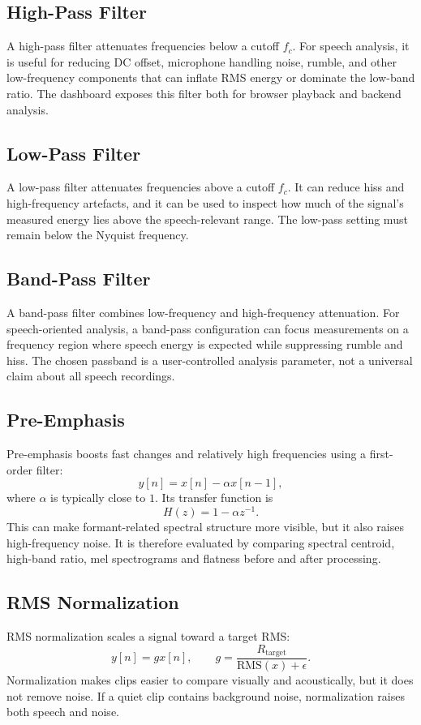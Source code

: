 ﻿\documentclass[11pt,a4paper]{article}
\begin{document}
\subsection{High-Pass Filter}
A high-pass filter attenuates frequencies below a cutoff $f_c$. For speech analysis, it is useful for reducing DC offset, microphone handling noise, rumble, and other low-frequency components that can inflate RMS energy or dominate the low-band ratio. The dashboard exposes this filter both for browser playback and backend analysis.

\subsection{Low-Pass Filter}
A low-pass filter attenuates frequencies above a cutoff $f_c$. It can reduce hiss and high-frequency artefacts, and it can be used to inspect how much of the signal's measured energy lies above the speech-relevant range. The low-pass setting must remain below the Nyquist frequency.

\subsection{Band-Pass Filter}
A band-pass filter combines low-frequency and high-frequency attenuation. For speech-oriented analysis, a band-pass configuration can focus measurements on a frequency region where speech energy is expected while suppressing rumble and hiss. The chosen passband is a user-controlled analysis parameter, not a universal claim about all speech recordings.

\subsection{Pre-Emphasis}
Pre-emphasis boosts fast changes and relatively high frequencies using a first-order filter:
\begin{equation}
    y[n] = x[n] - \alpha x[n-1],
\end{equation}
where $\alpha$ is typically close to $1$. Its transfer function is
\begin{equation}
    H(z) = 1 - \alpha z^{-1}.
\end{equation}
This can make formant-related spectral structure more visible, but it also raises high-frequency noise. It is therefore evaluated by comparing spectral centroid, high-band ratio, mel spectrograms and flatness before and after processing.

\subsection{RMS Normalization}
RMS normalization scales a signal toward a target RMS:
\begin{equation}
    y[n] = g x[n], \qquad g = \frac{R_{\mathrm{target}}}{\mathrm{RMS}(x)+\epsilon}.
\end{equation}
Normalization makes clips easier to compare visually and acoustically, but it does not remove noise. If a quiet clip contains background noise, normalization raises both speech and noise.
\end{document}
